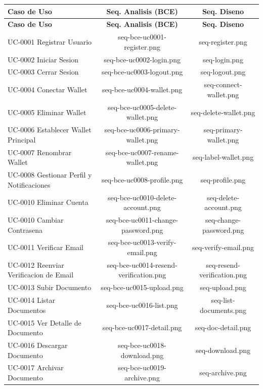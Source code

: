 \documentclass[11pt, a4paper]{article}
\begin{document}
{\begin{center}
\small
\renewcommand{\arraystretch}{1.1}
\begin{longtable}{|p{2.8cm}|c|c|}
\hline
\textbf{Caso de Uso} & \textbf{Seq. Analisis (BCE)} & \textbf{Seq. Diseno} \\
\hline
\endfirsthead
\hline
\textbf{Caso de Uso} & \textbf{Seq. Analisis (BCE)} & \textbf{Seq. Diseno} \\
\hline
\endhead
UC-0001 Registrar Usuario & seq-bce-uc0001-register.png & seq-register.png \\
\hline
UC-0002 Iniciar Sesion & seq-bce-uc0002-login.png & seq-login.png \\
\hline
UC-0003 Cerrar Sesion & seq-bce-uc0003-logout.png & seq-logout.png \\
\hline
UC-0004 Conectar Wallet & seq-bce-uc0004-wallet.png & seq-connect-wallet.png \\
\hline
UC-0005 Eliminar Wallet & seq-bce-uc0005-delete-wallet.png & seq-delete-wallet.png \\
\hline
UC-0006 Establecer Wallet Principal & seq-bce-uc0006-primary-wallet.png & seq-primary-wallet.png \\
\hline
UC-0007 Renombrar Wallet & seq-bce-uc0007-rename-wallet.png & seq-label-wallet.png \\
\hline
UC-0008 Gestionar Perfil y Notificaciones & seq-bce-uc0008-profile.png & seq-profile.png \\
\hline
UC-0010 Eliminar Cuenta & seq-bce-uc0010-delete-account.png & seq-delete-account.png \\
\hline
UC-0010 Cambiar Contrasena & seq-bce-uc0011-change-password.png & seq-change-password.png \\
\hline
UC-0011 Verificar Email & seq-bce-uc0013-verify-email.png & seq-verify-email.png \\
\hline
UC-0012 Reenviar Verificacion de Email & seq-bce-uc0014-resend-verification.png & seq-resend-verification.png \\
\hline
UC-0013 Subir Documento & seq-bce-uc0015-upload.png & seq-upload.png \\
\hline
UC-0014 Listar Documentos & seq-bce-uc0016-list.png & seq-list-documents.png \\
\hline
UC-0015 Ver Detalle de Documento & seq-bce-uc0017-detail.png & seq-doc-detail.png \\
\hline
UC-0016 Descargar Documento & seq-bce-uc0018-download.png & seq-download.png \\
\hline
UC-0017 Archivar Documento & seq-bce-uc0019-archive.png & seq-archive.png \\

\end{longtable}
\end{center}}
\end{document}
